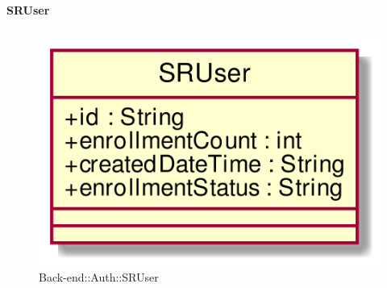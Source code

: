 \hypertarget{SRUser_label}{\paragraph{SRUser}}
\begin{figure}[h]
	\centering
	\includegraphics[width=\textwidth,height=\textheight,keepaspectratio]{images/ClassSRUser.png}
	\caption{Back-end::Auth::SRUser}
\end{figure}
